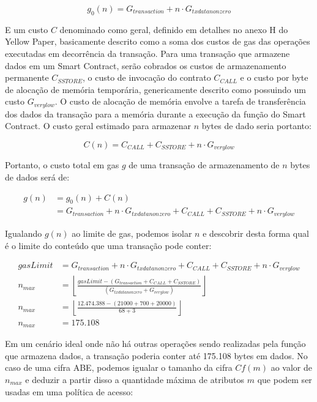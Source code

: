 \documentclass[a4paper,11pt]{article}
\begin{document}
\[g_{0}(n) = G_{transaction} + n \cdot G_{txdatanonzero}\]

E um custo $C$ denominado como geral, definido em detalhes no anexo H do Yellow Paper, basicamente descrito como a soma dos custos de gas das operações executadas em decorrência da transação.
Para uma transação que armazene dados em um Smart Contract, serão cobrados os custos de armazenamento permanente $C_{SSTORE}$, o custo de invocação do contrato $C_{CALL}$ e o custo por byte de alocação de memória temporária, genericamente descrito como possuindo um custo $G_{verylow}$.
O custo de alocação de memória envolve a tarefa de transferência dos dados da transação para a memória durante a execução da função do Smart Contract.
O custo geral estimado para armazenar $n$ bytes de dado seria portanto:

\[C(n) = C_{CALL} + C_{SSTORE} + n \cdot G_{verylow}\]

Portanto, o custo total em gas $g$ de uma transação de armazenamento de $n$ bytes de dados será de:

\begin{equation}
  \begin{aligned}
    g(n) & = g_{0}(n) + C(n)\\
      & = G_{transaction} + n \cdot G_{txdatanonzero} + C_{CALL} + C_{SSTORE} + n \cdot G_{verylow}
  \end{aligned}
\end{equation}

Igualando $g(n)$ ao limite de gas, podemos isolar $n$ e descobrir desta forma qual é o limite do conteúdo que uma transação pode conter:

\begin{equation}
  \begin{aligned}
    gasLimit & = G_{transaction} + n \cdot G_{txdatanonzero} + C_{CALL} + C_{SSTORE} + n \cdot G_{verylow} \\
     n_{max} & = \left\lfloor \frac{gasLimit - (G_{transaction} + C_{CALL} + C_{SSTORE})}{(G_{txdatanonzero} + G_{verylow})} \right\rfloor \\
     n_{max} & = \left\lfloor \frac{12.474.388 - (21000 + 700 + 20000)}{68 + 3} \right\rfloor \\
     n_{max} & = 175.108
  \end{aligned}
\end{equation}

Em um cenário ideal onde não há outras operações sendo realizadas pela função que armazena dados, a transação poderia conter até 175.108 bytes em dados.
No caso de uma cifra ABE, podemos igualar o tamanho da cifra $Cf(m)$ ao valor de $n_{max}$ e deduzir a partir disso a quantidade máxima de atributos $m$ que podem ser usadas em uma política de acesso:
\end{document}
